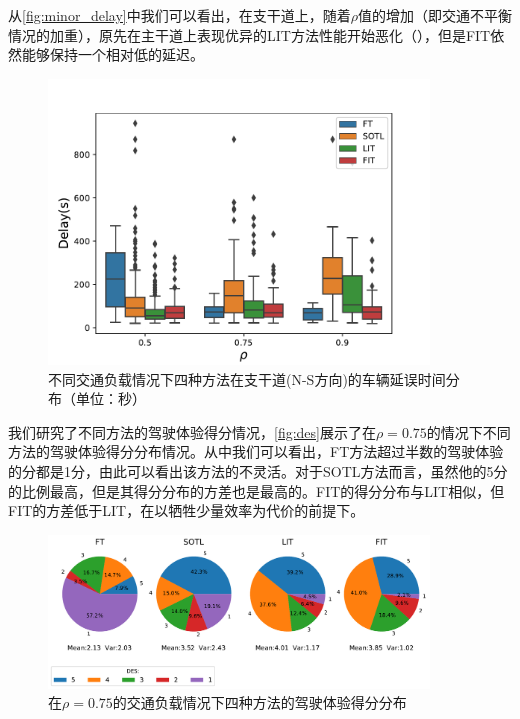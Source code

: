 从\autoref{fig:minor_delay}中我们可以看出，在支干道上，随着$\rho$值的增加（即交通不平衡情况的加重），原先在主干道上表现优异的LIT方法性能开始恶化（），但是FIT依然能够保持一个相对低的延迟。

\begin{figure}[htb]
    \includegraphics[width=0.9\textwidth]{fig/minor_delay.pdf}
    \caption{不同交通负载情况下四种方法在支干道(N-S方向)的车辆延误时间分布（单位：秒）}
    \label{fig:minor_delay}
\end{figure}

我们研究了不同方法的驾驶体验得分情况，\autoref{fig:des}展示了在$\rho=0.75$的情况下不同方法的驾驶体验得分分布情况。从中我们可以看出，FT方法超过半数的驾驶体验的分都是1分，由此可以看出该方法的不灵活。对于SOTL方法而言，虽然他的5分的比例最高，但是其得分分布的方差也是最高的。FIT的得分分布与LIT相似，但FIT的方差低于LIT，在以牺牲少量效率为代价的前提下。
\begin{figure}[t]
    \centering
    \includegraphics[width=0.9\textwidth]{fig/des.pdf}
    \caption{在$\rho=0.75$的交通负载情况下四种方法的驾驶体验得分分布}
    \label{fig:des}
\end{figure}

